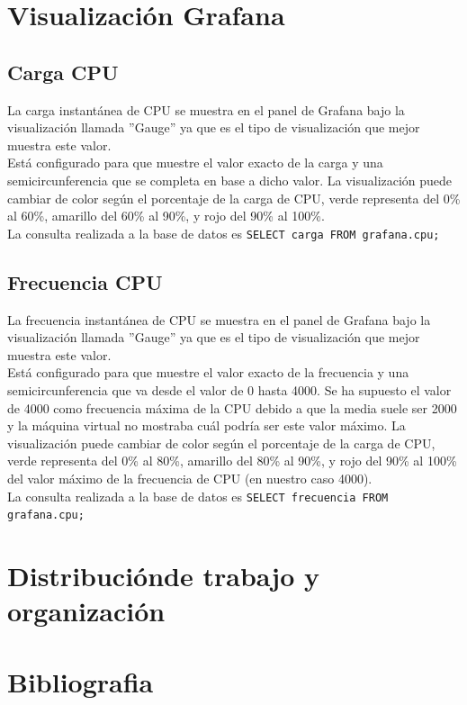 \documentclass{article}
\begin{document}
\section{Visualización Grafana}

\subsection{Carga CPU}

La carga instantánea de CPU se muestra en el panel de Grafana bajo la visualización llamada ''Gauge'' ya que es el tipo de visualización que mejor muestra este valor.\\

Está configurado para que muestre el valor exacto de la carga y una semicircunferencia que se completa en base a dicho valor. La visualización puede cambiar de color según el porcentaje de la carga de CPU, verde representa del 0\% al 60\%, amarillo del 60\% al 90\%, y rojo del 90\% al 100\%.\\

La consulta realizada a la base de datos es \lstinline{SELECT carga FROM grafana.cpu;}

\subsection{Frecuencia CPU}

La frecuencia instantánea de CPU se muestra en el panel de Grafana bajo la visualización llamada ''Gauge'' ya que es el tipo de visualización que mejor muestra este valor.\\

Está configurado para que muestre el valor exacto de la frecuencia y una semicircunferencia que va desde el valor de 0 hasta 4000. Se ha supuesto el valor de 4000 como frecuencia máxima de la CPU debido a que la media suele ser 2000 y la máquina virtual no mostraba cuál podría ser este valor máximo. La visualización puede cambiar de color según el porcentaje de la carga de CPU, verde representa del 0\% al 80\%, amarillo del 80\% al 90\%, y rojo del 90\% al 100\% del valor máximo de la frecuencia de CPU (en nuestro caso 4000).\\

La consulta realizada a la base de datos es \lstinline{SELECT frecuencia FROM grafana.cpu;}

\section{Distribuciónde trabajo y organización}

\section{Bibliografia}
\end{document}

